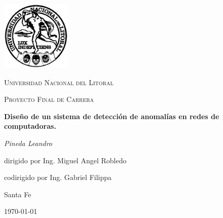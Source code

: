 \documentclass[a4paper,10pt, oneside]{book}
\begin{document}
\begin{titlepage}
	\centering
	\includegraphics[width=0.25\textwidth]{Universidad_del_Litoral}\par\vspace{1cm}
	{\scshape\LARGE Universidad Nacional del Litoral \par}
	\vspace{1cm}
	{\scshape\Large Proyecto Final de Carrera\par}
	\vspace{1.5cm}
	{\huge\bfseries Diseño de un sistema de detección de anomalías en redes de computadoras.\par}
	\vspace{2cm}
	{\Large\itshape Pineda Leandro\par}
	\vfill
	dirigido por Ing. Miguel Angel Robledo\par
	codirigido por Ing. Gabriel Filippa
	

	\vfill
	
	
	
	\large Santa Fe\par
	{\large \today\par}
	
\end{titlepage}

\modulolinenumbers[5]





\newpage
 
\nocite{*}
\printbibliography
\end{document}

